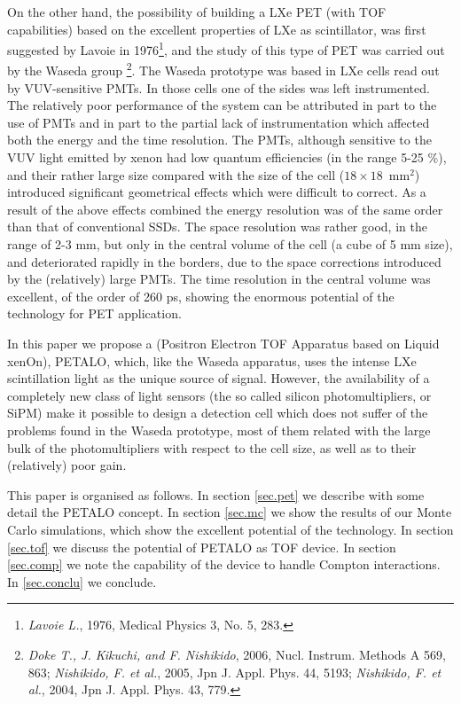 \documentclass[a4paper,11pt,oneside]{article}
\begin{document}
On the other hand, the possibility of building a LXe PET (with TOF capabilities) based on the excellent properties of LXe as scintillator, was first suggested by Lavoie in 1976\footnote{{\em Lavoie L.}, 1976, Medical Physics 3, No. 5, 283.}, and the study of this type of PET was carried out by the Waseda group \footnote{{\em Doke T., J. Kikuchi, and F. Nishikido}, 2006, 
Nucl. Instrum. Methods A 569, 863;  {\em Nishikido, F. et al.}, 2005, Jpn J. Appl. Phys. 44, 5193; {\em Nishikido, F. et al.}, 2004, Jpn J. Appl. Phys. 43, 779.}. The Waseda prototype was based in LXe cells read out by VUV-sensitive PMTs. In those cells one of the sides was left instrumented. The relatively poor performance of the system can be attributed in part to the use of PMTs and in part to the partial lack of instrumentation which affected both the energy and the time resolution. The PMTs, although sensitive to the VUV light emitted by xenon had low quantum efficiencies (in the range 5-25 \%), and their rather large size compared with the size of the cell ($18\times 18$~mm$^2$) introduced significant geometrical effects which were difficult to correct. As a result of the above effects combined the energy resolution was of the same order than that of conventional SSDs. The space resolution was rather good, in the range of 2-3 mm, but only in the central volume of the cell (a cube of 5 mm size), and deteriorated rapidly in the borders, due to the space corrections introduced by the (relatively) large PMTs. The time resolution in the central volume was excellent, of the order of 260 ps, showing the enormous potential of the technology for PET application. 

In this paper we propose a (Positron Electron TOF Apparatus based on Liquid xenOn), PETALO, which, like the Waseda apparatus, uses the intense LXe scintillation light as the unique source of signal. However, the availability of a completely new class of light sensors (the so called silicon photomultipliers, or SiPM) make it possible to design a detection cell which does not suffer of the problems found in the Waseda prototype, most of them related with the large bulk of the photomultipliers with respect to the cell size, as well as to their (relatively) poor gain. 

This paper is organised as follows. In section \ref{sec.pet} we describe with some detail the PETALO concept. In section \ref{sec.mc} we show the results of our Monte Carlo simulations, which show the excellent potential of the technology. In section \ref{sec.tof} we discuss the potential of PETALO as TOF device. In section \ref{sec.comp} we note the capability of the device to handle Compton interactions. In \ref{sec.conclu} we conclude. 
\end{document}
